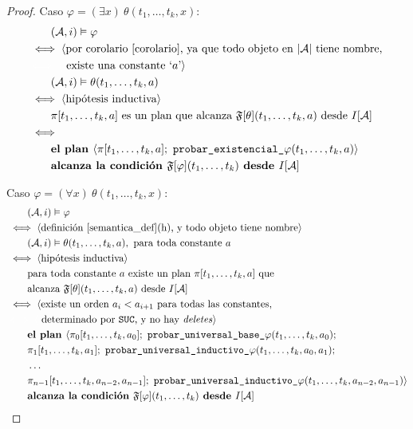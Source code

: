 \begin{proof}
Caso $\varphi = (\exists x)\ \theta(t_1,\ldots,t_k,x):$
\begin{alignat*}{1}
& \quad \quad (\A, i) \models \varphi\\
& \iff \langle \text{por corolario \ref{corolario}, ya que todo objeto en $|\A|$
tiene nombre, }\\
& {\color{white} \iff \langle} \text{ existe una constante `$a$'} \rangle\\
& \quad \quad (\A, i) \models \theta(t_1,\ldots,t_k,a)\\
& \iff \tup{\text{hipótesis inductiva}}\\
& \quad \quad \pi[t_1,\ldots,t_k,a] \text{ es un plan que alcanza }
\FT[\theta](t_1,\ldots,t_k,a) \text{ desde } I[\A]\\
& \iff \\
& \quad \quad \textbf{el plan } \langle \pi[t_1,\ldots,t_k,a];\
\texttt{probar\_existencial\_}\varphi(t_1,\ldots,t_k,a)\rangle\\
& \quad \quad \textbf{alcanza la condición } \FT[\varphi](t_1,\ldots,t_k)
\textbf{ desde } I[\A]
\end{alignat*}

Caso $\varphi = (\forall x)\ \theta(t_1,\ldots,t_k,x):$
\begin{alignat*}{1}
& \quad \quad (\A, i) \models \varphi\\
& \iff \tup{\text{definición \ref{semantica_def}(h), y todo objeto tiene nombre}}\\
& \quad \quad (\A, i) \models \theta(t_1,\ldots,t_k,a), \text{ para toda
constante $a$}\\
& \iff \tup{\text{hipótesis inductiva}}\\
& \quad\quad \text{para toda constante $a$ existe un plan $\pi[t_1,\ldots,t_k,a]$ que}\\
& \quad\quad \text{alcanza $\FT[\theta](t_1,\ldots,t_k,a)$ desde } I[\A]\\
& \iff \langle \text{existe un orden $a_i < a_{i+1}$ para todas las constantes,}\\
& {\color{white} \iff \langle} \text{ determinado por \texttt{SUC}, y no hay
\textit{deletes}} \rangle\\
& \quad \quad \textbf{el plan } \langle \pi_0[t_1,\ldots,t_k,a_0];\
\texttt{probar\_universal\_base\_}\varphi(t_1,\ldots,t_k,a_0);\\
& \quad \quad \pi_1[t_1,\ldots,t_k,a_1];\
\texttt{probar\_universal\_inductivo\_}\varphi(t_1,\ldots,t_k,a_0,a_1);\\
& \quad \quad \ldots\ \\
& \quad \quad \pi_{n-1}[t_1,\ldots,t_k,a_{n-2},a_{n-1}];\
\texttt{probar\_universal\_inductivo\_}\varphi(t_1,\ldots,t_k,a_{n-2},a_{n-1}) \rangle\\
& \quad \quad \textbf{alcanza la condición } \FT[\varphi](t_1,\ldots,t_k)
\textbf{ desde } I[\A]
\end{alignat*}
\end{proof}

